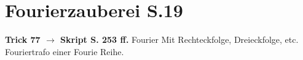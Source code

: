 \section{Fourierzauberei S.19}
\textbf{Trick 77 $\rightarrow$ Skript S. 253 ff.} Fourier Mit Rechteckfolge, Dreieckfolge, etc. Fouriertrafo einer Fourie Reihe.



\newpage